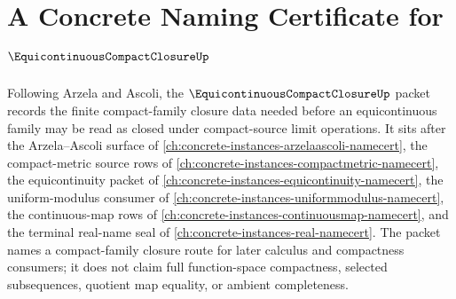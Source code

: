 \chapter{A Concrete Naming Certificate for $\EquicontinuousCompactClosureUp$}
\label{ch:concrete-instances-equicontinuous-compact-closure-namecert}

Following Arzela and Ascoli, the $\EquicontinuousCompactClosureUp$ packet records the finite compact-family closure data needed before an equicontinuous family may be read as closed under compact-source limit operations. It sits after the Arzela--Ascoli surface of \autoref{ch:concrete-instances-arzelaascoli-namecert}, the compact-metric source rows of \autoref{ch:concrete-instances-compactmetric-namecert}, the equicontinuity packet of \autoref{ch:concrete-instances-equicontinuity-namecert}, the uniform-modulus consumer of \autoref{ch:concrete-instances-uniformmodulus-namecert}, the continuous-map rows of \autoref{ch:concrete-instances-continuousmap-namecert}, and the terminal real-name seal of \autoref{ch:concrete-instances-real-namecert}. The packet names a compact-family closure route for later calculus and compactness consumers; it does not claim full function-space compactness, selected subsequences, quotient map equality, or ambient completeness.

